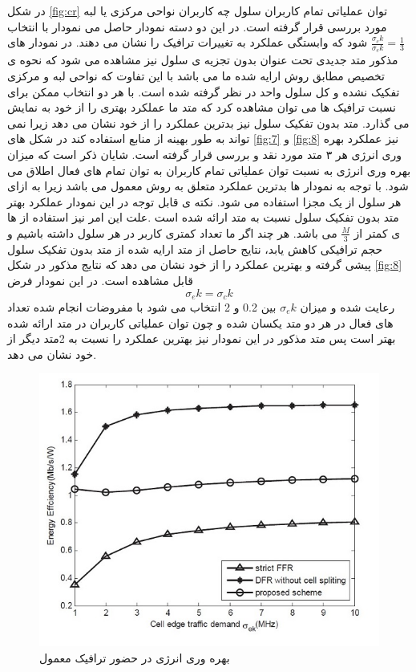 در شکل \eqref{fig:cr}  توان عملیاتی تمام کاربران سلول چه کاربران
نواحی مرکزی یا لبه مورد بررسی قرار گرفته است. در این
 دو دسته نمودار حاصل می
نمودار با انتخاب  $\frac{\sigma_ck}{\sigma_ek} = \frac{1}{3}$ 
شود که وابستگی عملکرد به تغییرات ترافیک را نشان می
دهند. در نمودار های مذکور متد جدیدی تحت عنوان  بدون تجزیه ی سلول نیز مشاهده می شود که نحوه
ی تخصیص مطابق روش ارایه شده ما می باشد با این
تفاوت که نواحی لبه و مرکزی تفکیک نشده و کل سلول
واحد در نظر گرفته شده است. با هر دو انتخاب ممکن برای
نسبت ترافیک ها می توان مشاهده کرد که متد ما عملکرد
بهتری را از خود به نمایش می گذارد. متد    بدون
تفکیک سلول نیز بدترین عملکرد را از خود نشان می دهد
زیرا نمی تواند به طور بهینه از منابع استفاده کند
در شکل های \eqref{fig:7} و \eqref{fig:8} نیز عملکرد بهره وری انرژی هر ۳
متد مورد نقد و بررسی قرار گرفته است. شایان ذکر است
که میزان بهره وری انرژی به نسبت توان عملیاتی تمام
کاربران به توان تمام  های فعال اطلاق می شود. با
توجه به نمودار ها بدترین عملکرد متعلق به روش 
معمول می باشد زیرا به ازای هر سلول از یک  مجزا
استفاده می شود.
نکته ی قابل توجه در این نمودار عملکرد
بهتر متد  بدون تفکیک سلول نسبت به متد ارائه شده
است .علت این امر نیز استفاده از  ها ی کمتر از
$\frac{M}{3}$
می باشد. هر چند اگر ما تعداد کمتری کاربر در هر سلول داشته
باشیم و حجم ترافیکی کاهش یابد، نتایج حاصل از متد ارایه
شده از متد  بدون تفکیک سلول پیشی گرفته و بهترین
عملکرد را از خود نشان می دهد که نتایج مذکور در شکل
  \eqref{fig:8}
   قابل مشاهده است. در این نمودار فرض
\begin{equation*}
\sigma_e k = \sigma_c k
\end{equation*}  
 رعایت شده و میزان $\sigma_ek$ بین  0.2 و 2 انتخاب می شود
با مفروضات انجام شده تعداد  های فعال در هر دو
متد یکسان شده و چون توان عملیاتی کاربران در متد ارائه
شده بهتر است پس متد مذکور در این نمودار نیز بهترین
عملکرد را نسبت به  2متد دیگر از خود نشان می دهد.  
\begin{figure}
  \centering
    \includegraphics[scale=0.7]{7}
  \caption{ بهره وری انرژی در حضور ترافیک معمول \cite{graph}  }
  \label{fig:7}
\end{figure}

